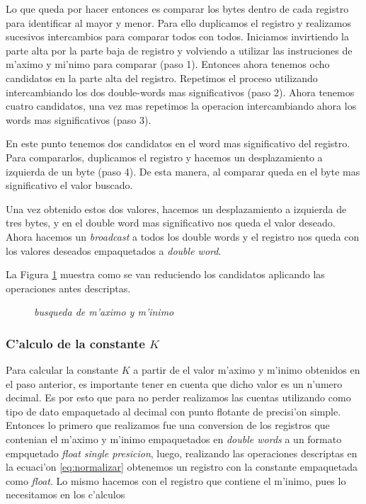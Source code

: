 Lo que queda por hacer entonces es comparar los bytes dentro de cada registro para identificar al mayor y menor. Para ello duplicamos el registro y realizamos sucesivos intercambios para comparar todos con todos. Iniciamos invirtiendo la parte alta por la parte baja de registro y volviendo a utilizar las instruciones de m'aximo y mi'nimo para comparar (paso 1). Entonces ahora tenemos ocho candidatos en la parte alta del registro. Repetimos el proceso utilizando intercambiando los dos double-words mas significativos (paso 2). Ahora tenemos cuatro candidatos, una vez mas repetimos la operacion intercambiando ahora los words mas significativos (paso 3).

En este punto tenemos dos candidatos en el word mas significativo del registro. Para compararlos, duplicamos el registro y hacemos un desplazamiento a izquierda de un byte (paso 4). De esta manera, al comparar queda en el byte mas significativo el valor buscado. 

Una vez obtenido estos dos valores, hacemos un desplazamiento a izquierda de tres bytes, y en el double word mas significativo nos queda el valor deseado. Ahora hacemos un \textit{broadcast} a todos los double words y el registro nos queda con los valores deseados empaquetados a \textit{double word}.

La Figura \ref{est:normalizar-1} muestra como se van reduciendo los candidatos aplicando las operaciones antes descriptas.

\begin{figure}[ht]
\caption{\textit{busqueda de m'aximo y m'inimo}}
\label{est:normalizar-1}
\end{figure}


\subsubsection*{C'alculo de la constante $K$}

Para calcular la constante $K$ a partir de el valor m'aximo y m'inimo obtenidos en el paso anterior, es importante tener en cuenta que dicho valor es un n'umero decimal. Es por esto que para no perder realizamos las cuentas utilizando como tipo de dato empaquetado al decimal con punto flotante de precisi'on simple. Entonces lo primero que realizamos fue una conversion de los registros que contenian el m'aximo y m'inimo empaquetados en \textit{double words} a un formato empquetado \textit{float single presicion}, luego, realizando las operaciones descriptas en la ecuaci'on \ref{eq:normalizar} obtenemos un registro con la constante empaquetada como \textit{float}. Lo mismo hacemos con el registro que contiene el m'inimo, pues lo necesitamos en los c'alculos


